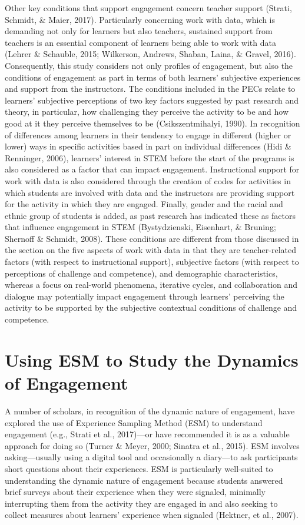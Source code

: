 \documentclass[]{book}
\theoremstyle{definition}
\theoremstyle{definition}
\theoremstyle{definition}
\theoremstyle{remark}
\begin{document}
Other key conditions that support engagement concern teacher support
(Strati, Schmidt, \& Maier, 2017). Particularly concerning work with
data, which is demanding not only for learners but also teachers,
sustained support from teachers is an essential component of learners
being able to work with data (Lehrer \& Schauble, 2015; Wilkerson,
Andrews, Shaban, Laina, \& Gravel, 2016). Consequently, this study
considers not only profiles of engagement, but also the conditions of
engagement as part in terms of both learners' subjective experiences and
support from the instructors. The conditions included in the PECs relate
to learners' subjective perceptions of two key factors suggested by past
research and theory, in particular, how challenging they perceive the
activity to be and how good at it they perceive themselves to be
(Csikszentmihalyi, 1990). In recognition of differences among learners
in their tendency to engage in different (higher or lower) ways in
specific activities based in part on individual differences (Hidi \&
Renninger, 2006), learners' interest in STEM before the start of the
programs is also considered as a factor that can impact engagement.
Instructional support for work with data is also considered through the
creation of codes for activities in which students are involved with
data and the instructors are providing support for the activity in which
they are engaged. Finally, gender and the racial and ethnic group of
students is added, as past research has indicated these as factors that
influence engagement in STEM (Bystydzienski, Eisenhart, \& Bruning;
Shernoff \& Schmidt, 2008). These conditions are different from those
discussed in the section on the five aspects of work with data in that
they are teacher-related factors (with respect to instructional
support), subjective factors (with respect to perceptions of challenge
and competence), and demographic characteristics, whereas a focus on
real-world phenomena, iterative cycles, and collaboration and dialogue
may potentially impact engagement through learners' perceiving the
activity to be supported by the subjective contextual conditions of
challenge and competence.

\section{Using ESM to Study the Dynamics of
Engagement}\label{using-esm-to-study-the-dynamics-of-engagement}

A number of scholars, in recognition of the dynamic nature of
engagement, have explored the use of Experience Sampling Method (ESM) to
understand engagement (e.g., Strati et al., 2017)---or have recommended
it is as a valuable approach for doing so (Turner \& Meyer, 2000;
Sinatra et al., 2015). ESM involves asking---usually using a digital
tool and occasionally a diary---to ask participants short questions
about their experiences. ESM is particularly well-suited to
understanding the dynamic nature of engagement because students answered
brief surveys about their experience when they were signaled, minimally
interrupting them from the activity they are engaged in and also seeking
to collect measures about learners' experience when signaled (Hektner,
et al., 2007).
\end{document}
